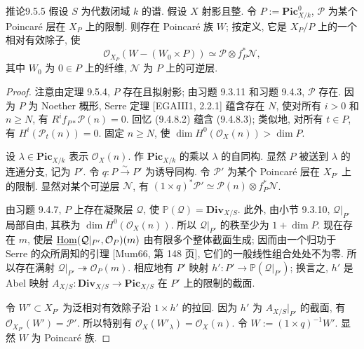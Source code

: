 \begin{origstatement}{推论}{9.5.5}\label{ch09s05:cor9.5.5}
假设 $S$ 为代数闭域 $k$ 的谱. 假设 $X$ 射影且整. 令 $P:=\mathbf{Pic}^0_{X/k}$, $\mathcal P$ 为某个 Poincar\'e 层在 $X_P$ 上的限制. 则存在 Poincar\'e 族 $W$; 按定义, 它是 $X_P/P$ 上的一个相对有效除子, 使
\[
 \mathcal O_{X_P}(W-(W_0\times P))\simeq\mathcal P\otimes f_P^*\mathcal N,
\]
其中 $W_0$ 为 $0\in P$ 上的纤维, $\mathcal N$ 为 $P$ 上的可逆层.
\end{origstatement}
\begin{proof}
注意由定理 9.5.4, $P$ 存在且拟射影; 由习题 9.3.11 和习题 9.4.3, $\mathcal P$ 存在. 因为 $P$ 为 Noether 概形, Serre 定理 [EGAIII1, 2.2.1] 蕴含存在 $N$, 使对所有 $i>0$ 和 $n\geq N$, 有 $R^if_{P*}\mathcal P(n)=0$. 回忆 (9.4.8.2) 蕴含 (9.4.8.3); 类似地, 对所有 $t\in P$, 有 $H^i(\mathcal P_t(n))=0$. 固定 $n\geq N$, 使 $\dim H^0(\mathcal O_X(n))>\dim P$.

设 $\lambda\in\mathbf{Pic}_{X/k}$ 表示 $\mathcal O_X(n)$. 作 $\mathbf{Pic}_{X/k}$ 的乘以 $\lambda$ 的自同构. 显然 $P$ 被送到 $\lambda$ 的连通分支, 记为 $P'$. 令 $q:P\xrightarrow{\sim}P'$ 为诱导同构. 令 $\mathcal P'$ 为某个 Poincar\'e 层在 $X_{P'}$ 上的限制. 显然对某个可逆层 $\mathcal N$, 有 $(1\times q)^*\mathcal P'\simeq\mathcal P(n)\otimes f_P^*\mathcal N$.

由习题 9.4.7, $P$ 上存在凝聚层 $\mathcal Q$, 使 $\mathbb P(\mathcal Q)=\mathbf{Div}_{X/S}$. 此外, 由小节 9.3.10, $\mathcal Q|_{P'}$ 局部自由, 其秩为 $\dim H^0(\mathcal O_X(n))$. 所以 $\mathcal Q|_{P'}$ 的秩至少为 $1+\dim P$. 现在存在 $m$, 使层 $\underline{\operatorname{Hom}}(\mathcal Q|_{P'},\mathcal O_P)(m)$ 由有限多个整体截面生成; 因而由一个归功于 Serre 的众所周知的引理 [Mum66, 第 148 页], 它们的一般线性组合处处不为零. 所以存在满射 $\mathcal Q|_{P'}\twoheadrightarrow\mathcal O_P(m)$. 相应地有 $P'$ 映射 $h':P'\to\mathbb P(\mathcal Q|_{P'})$; 换言之, $h'$ 是 Abel 映射 $A_{X/S}:\mathbf{Div}_{X/S}\to\mathbf{Pic}_{X/S}$ 在 $P'$ 上的限制的截面.

令 $W'\subset X_{P'}$ 为泛相对有效除子沿 $1\times h'$ 的拉回. 因为 $h'$ 为 $A_{X/S}|_{P'}$ 的截面, 有 $\mathcal O_{X_{P'}}(W')=\mathcal P'$. 所以特别有 $\mathcal O_X(W'_\lambda)=\mathcal O_X(n)$. 令 $W:=(1\times q)^{-1}W'$. 显然 $W$ 为 Poincar\'e 族.
\end{proof}

